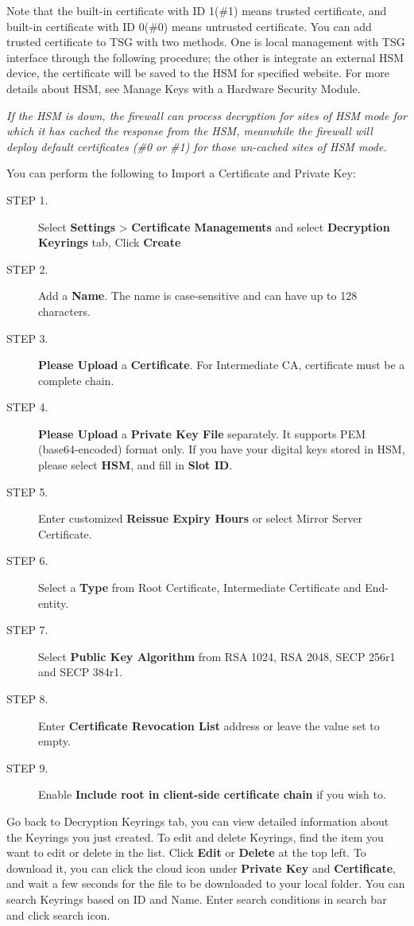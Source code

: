 Note that the built-in certificate with ID 1(\#1) means trusted certificate, and built-in certificate with ID 0(\#0) means untrusted certificate. You can add trusted certificate to TSG with two methods. One is local management with TSG interface through the following procedure; the other is integrate an external HSM device, the certificate will be saved to the HSM for specified website. For more details about HSM, see Manage Keys with a Hardware Security Module.


\notemark\textit{If the HSM is down, the firewall can process decryption for sites of HSM mode for which it has cached the response from the HSM, meanwhile the firewall will deploy default certificates (\#0 or \#1) for those un-cached sites of HSM mode.}


You can perform the following to Import a Certificate and Private Key:

\begin{description}
    \item[STEP 1.]	Select \textbf{Settings} > \textbf{Certificate Managements} and select \textbf{Decryption Keyrings} tab, Click \textbf{Create}
    \item[STEP 2.]	Add a \textbf{Name}. The name is case-sensitive and can have up to 128 characters.
    \item[STEP 3.]	\textbf{Please Upload} a \textbf{Certificate}. For Intermediate CA, certificate must be a complete chain.
    \item[STEP 4.]	\textbf{Please Upload} a \textbf{Private Key File} separately. It supports PEM (base64-encoded) format only. 
        If you have your digital keys stored in HSM, please select \textbf{HSM}, and fill in \textbf{Slot ID}.
    \item[STEP 5.]	Enter customized \textbf{Reissue Expiry Hours} or select Mirror Server Certificate.
    \item[STEP 6.]	Select a \textbf{Type} from Root Certificate, Intermediate Certificate and End-entity.
    \item[STEP 7.]	Select \textbf{Public Key Algorithm} from RSA 1024, RSA 2048, SECP 256r1 and SECP 384r1.
    \item[STEP 8.]	Enter \textbf{Certificate Revocation List} address or leave the value set to empty.
    \item[STEP 9.]	Enable \textbf{Include root in client-side certificate chain} if you wish to.
\end{description}

Go back to Decryption Keyrings tab, you can view detailed information about the Keyrings you just created. 
To edit and delete Keyrings, find the item you want to edit or delete in the list. Click \textbf{Edit} or \textbf{Delete} at the top left. 
To download it, you can click the cloud icon under \textbf{Private Key} and \textbf{Certificate}, and wait a few seconds for the file to be downloaded to your local folder. 
You can search Keyrings based on ID and Name. Enter search conditions in search bar and click search icon.

